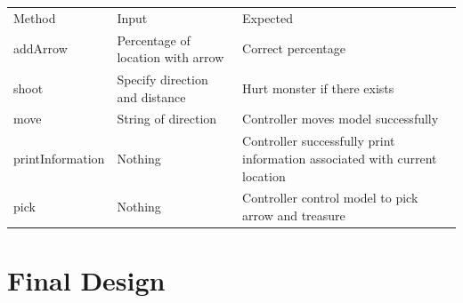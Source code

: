 \documentclass[12pt]{amsart}
\begin{document}
\begin{table}[htbp]
   \begin{tabular}{@{} lll @{}} %

      Method     & Input & Expected \\
         addArrow   & Percentage of location with arrow    &  Correct percentage \\
         shoot & Specify direction and distance & Hurt monster if there exists\\
         move & String of direction & Controller moves model successfully\\
         printInformation & Nothing & Controller successfully print information associated with current location\\
         pick & Nothing & Controller control model to pick arrow and treasure\\
    
    \end{tabular}
\end{table}

\newpage

\section{Final Design}
\end{document}

